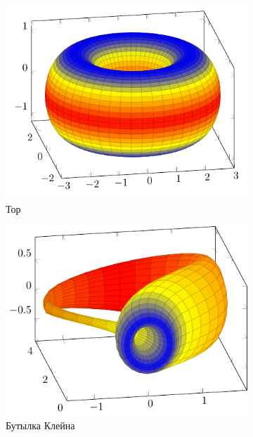 \begin{figure}[htbp]
    \centering
    \begin{subfigure}[b]{0.48\textwidth}
        \includegraphics[scale=0.8]{images/c9.2.pdf}
        \caption{Тор}
        \label{fig:thorus}
    \end{subfigure}
    \hfill
    \begin{subfigure}[b]{0.48\textwidth}
        \includegraphics[scale=0.8]{images/c9.1.pdf}
        \caption{Бутылка Клейна}
        \label{fig:kleyn}
    \end{subfigure}
    \hfill
    \begin{subfigure}[b]{0.48\textwidth}

\end{subfigure}
\end{figure}
